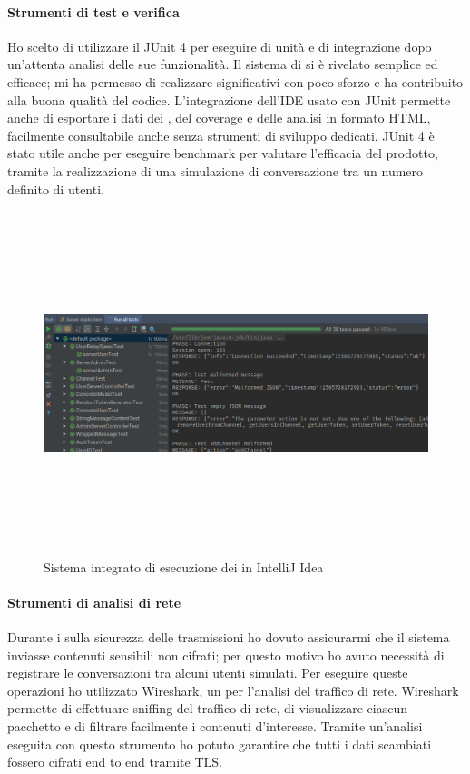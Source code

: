		\paragraph{Strumenti di test e verifica}
		Ho scelto di utilizzare il  JUnit 4 per eseguire  di unità e di integrazione dopo un'attenta analisi delle sue funzionalità. Il sistema di  si è rivelato semplice ed efficace; mi ha permesso di realizzare  significativi con poco sforzo e ha contribuito alla buona qualità del codice. L'integrazione dell'IDE usato con JUnit permette anche di esportare i dati dei , del coverage e delle analisi in formato \gls{HTML}, facilmente consultabile anche senza strumenti di sviluppo dedicati. JUnit 4 è stato utile anche per eseguire benchmark per valutare l'efficacia del prodotto, tramite la realizzazione di una simulazione di conversazione tra un numero definito di utenti.
		\begin{figure}[H]
			\begin{center}
				\includegraphics[width=16.5cm,height=10cm,keepaspectratio]{immagini/intellij-tests}
				\caption{Sistema integrato di esecuzione dei  in IntelliJ Idea}
			\end{center}
		\end{figure}
		
		\paragraph{Strumenti di analisi di rete}
		Durante i  sulla sicurezza delle trasmissioni ho dovuto assicurarmi che il sistema inviasse contenuti sensibili non cifrati; per questo motivo ho avuto necessità di registrare le conversazioni tra alcuni utenti simulati. Per eseguire queste operazioni ho utilizzato Wireshark, un   per l'analisi del traffico di rete. Wireshark permette di effettuare sniffing del traffico di rete, di visualizzare ciascun pacchetto e di filtrare facilmente i contenuti d'interesse. Tramite un'analisi eseguita con questo strumento ho potuto garantire che tutti i dati scambiati fossero cifrati end to end tramite \gls{TLS}.\@
		

